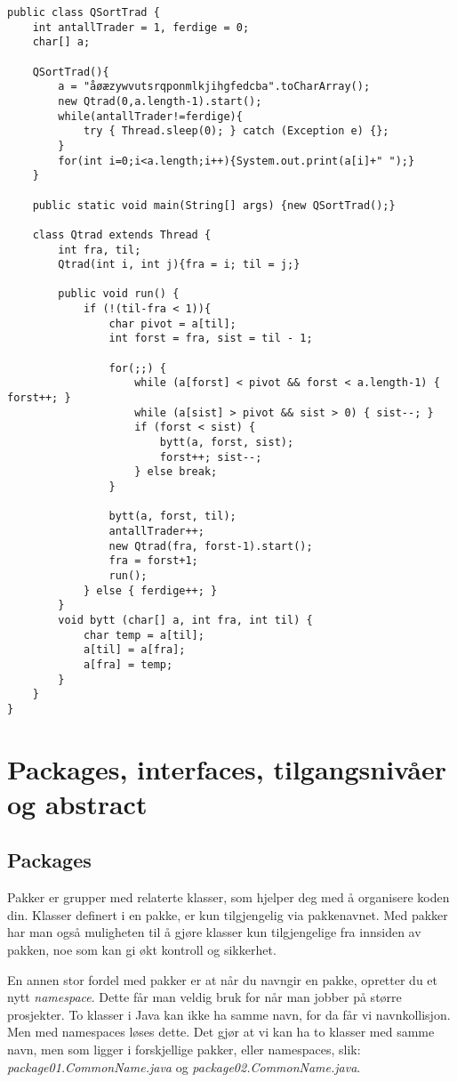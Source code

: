 \documentclass[11pt]{article}
\begin{document}
\begin{verbatim}
public class QSortTrad {
    int antallTrader = 1, ferdige = 0;
    char[] a;

    QSortTrad(){
        a = "åøæzywvutsrqponmlkjihgfedcba".toCharArray();
        new Qtrad(0,a.length-1).start();
        while(antallTrader!=ferdige){
            try { Thread.sleep(0); } catch (Exception e) {};
        }
        for(int i=0;i<a.length;i++){System.out.print(a[i]+" ");}
    }

    public static void main(String[] args) {new QSortTrad();}

    class Qtrad extends Thread {
        int fra, til;
        Qtrad(int i, int j){fra = i; til = j;}

        public void run() {
            if (!(til-fra < 1)){
                char pivot = a[til];
                int forst = fra, sist = til - 1;

                for(;;) {
                    while (a[forst] < pivot && forst < a.length-1) { forst++; }
                    while (a[sist] > pivot && sist > 0) { sist--; }
                    if (forst < sist) { 
                        bytt(a, forst, sist);
                        forst++; sist--;
                    } else break;
                }

                bytt(a, forst, til);
                antallTrader++;
                new Qtrad(fra, forst-1).start();
                fra = forst+1;
                run();
            } else { ferdige++; }
        }
        void bytt (char[] a, int fra, int til) {
            char temp = a[til];
            a[til] = a[fra];
            a[fra] = temp;
        }
    }
}
\end{verbatim}
\section{Packages, interfaces, tilgangsnivåer og abstract}
\label{sec-13}
\subsection{Packages}
\label{sec-13-1}

Pakker er grupper med relaterte klasser, som hjelper deg med å 
organisere koden din. Klasser definert i en pakke, er kun tilgjengelig
via pakkenavnet. Med pakker har man også muligheten til å gjøre
klasser kun tilgjengelige fra innsiden av pakken, noe som kan gi økt
kontroll og sikkerhet. 

En annen stor fordel med pakker er at når du navngir en pakke,
opretter du et nytt \emph{namespace}. Dette får man veldig bruk for når man
jobber på større prosjekter. To klasser i Java kan ikke ha samme navn,
for da får vi navnkollisjon. Men med namespaces løses dette. Det gjør
at vi kan ha to klasser med samme navn, men som ligger i forskjellige
pakker, eller namespaces, slik: \emph{package01.CommonName.java} og
\emph{package02.CommonName.java}. 
\end{document}
